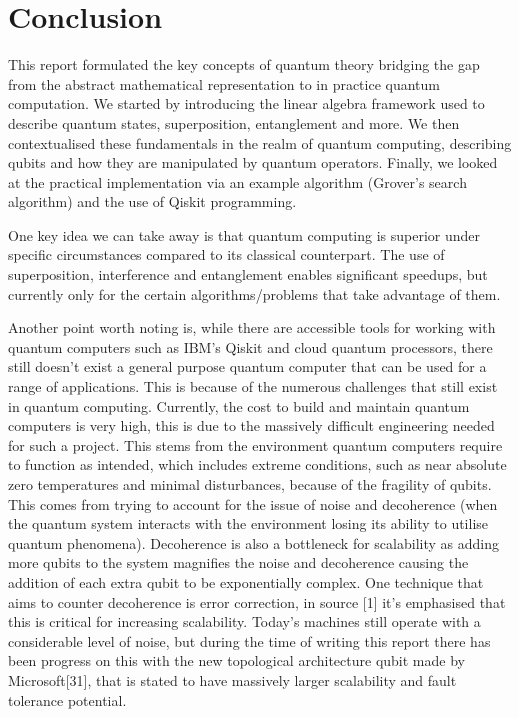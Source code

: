 \chapter{Conclusion}

This report formulated the key concepts of quantum theory bridging the gap from the abstract mathematical representation to in practice quantum computation. We started by introducing the linear algebra framework used to describe quantum states, superposition, entanglement and more. We then contextualised these fundamentals in the realm of quantum computing, describing qubits and how they are manipulated by quantum operators. Finally, we looked at the practical implementation via an example algorithm (Grover's search algorithm) and the use of Qiskit programming. 

\noindent One key idea we can take away is that quantum computing is superior under specific circumstances compared to its classical counterpart. The use of superposition, interference and entanglement enables significant speedups, but currently only for the certain algorithms/problems that take advantage of them.

\noindent Another point worth noting is, while there are accessible tools for working with quantum computers such as IBM's Qiskit and cloud quantum processors, there still doesn't exist a general purpose quantum computer that can be used for a range of applications. This is because of the numerous challenges that still exist in quantum computing. Currently, the cost to build and maintain quantum computers is very high, this is due to the massively difficult engineering needed for such a project. This stems from the environment quantum computers require to function as intended, which includes extreme conditions, such as near absolute zero temperatures and minimal disturbances, because of the fragility of qubits. This comes from trying to account for the issue of noise and decoherence (when the quantum system interacts with the environment losing its ability to utilise quantum phenomena). Decoherence is also a bottleneck for scalability as adding more qubits to the system magnifies the noise and decoherence causing the addition of each extra qubit to be exponentially complex. One technique that aims to counter decoherence is error correction, in source [1] it's emphasised that this is critical for increasing scalability. Today's machines still operate with a considerable level of noise, but during the time of writing this report there has been progress on this with the new topological architecture qubit made by Microsoft[31], that is stated to have massively larger scalability and fault tolerance potential.

